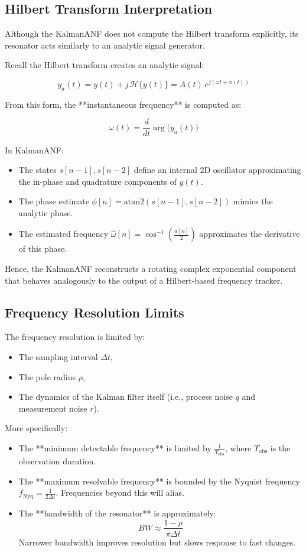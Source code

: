 \documentclass{article}
\begin{document}
\subsection{Hilbert Transform Interpretation}

Although the KalmanANF does not compute the Hilbert transform explicitly, its resonator acts similarly to an analytic signal generator.

Recall the Hilbert transform creates an analytic signal:

\[
y_a(t) = y(t) + j\,\mathcal{H}\{y(t)\} = A(t)\,e^{j(\omega t + \phi(t))}
\]

From this form, the **instantaneous frequency** is computed as:

\[
\omega(t) = \frac{d}{dt} \arg\bigl(y_a(t)\bigr)
\]

In KalmanANF:
\begin{itemize}
  \item The states \(s[n-1], s[n-2]\) define an internal 2D oscillator approximating the in-phase and quadrature components of \(y(t)\).
  \item The phase estimate \(\phi[n] = \mathrm{atan2}(s[n-1], s[n-2])\) mimics the analytic phase.
  \item The estimated frequency \(\hat{\omega}[n] = \cos^{-1}\left(\frac{a[n]}{2}\right)\) approximates the derivative of this phase.
\end{itemize}

Hence, the KalmanANF reconstructs a rotating complex exponential component that behaves analogously to the output of a Hilbert-based frequency tracker.

\subsection{Frequency Resolution Limits}

The frequency resolution is limited by:
\begin{itemize}
    \item The sampling interval \(\Delta t\),
    \item The pole radius \(\rho\),
    \item The dynamics of the Kalman filter itself (i.e., process noise \(q\) and measurement noise \(r\)).
\end{itemize}

More specifically:
\begin{itemize}
    \item The **minimum detectable frequency** is limited by \(\frac{1}{T_{\text{obs}}}\), where \(T_{\text{obs}}\) is the observation duration.
    \item The **maximum resolvable frequency** is bounded by the Nyquist frequency \(f_{\text{Nyq}} = \frac{1}{2\Delta t}\). Frequencies beyond this will alias.
    \item The **bandwidth of the resonator** is approximately:
    \[
    BW \approx \frac{1 - \rho}{\pi \Delta t}
    \]
    Narrower bandwidth improves resolution but slows response to fast changes.
\end{itemize}
\end{document}

